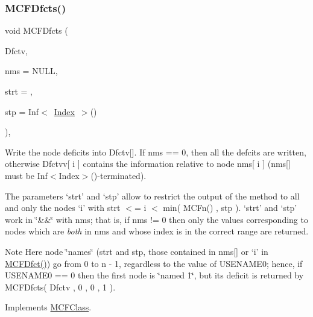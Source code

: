 \subsubsection{\texorpdfstring{M\+C\+F\+Dfcts()}{MCFDfcts()}}
{\footnotesize\ttfamily void M\+C\+F\+Dfcts (\begin{DoxyParamCaption}\item[{\mbox{\hyperlink{class_m_c_f_class_a9dae1f1a39c208ce3c2b337cd5bb3d00}{F\+Row}}}]{Dfctv,  }\item[{\mbox{\hyperlink{class_m_c_f_class_a81575b2d4e4d5636b17170432150ae69}{c\+Index\+\_\+\+Set}}}]{nms = {\ttfamily NULL},  }\item[{\mbox{\hyperlink{class_m_c_f_class_a76aaabb20535c51a2752b93f6c38fe54}{c\+Index}}}]{strt = {},  }\item[{\mbox{\hyperlink{class_m_c_f_class_ad53d6229d7ec28555a9c9c2fd9abf773}{Index}}}]{stp = {\ttfamily Inf$<$~\mbox{\hyperlink{class_m_c_f_class_ad53d6229d7ec28555a9c9c2fd9abf773}{Index}}~$>$()} }\end{DoxyParamCaption})\hspace{0.3cm}{\ttfamily [override]}, {\ttfamily [virtual]}}

Write the node deficits into Dfctv\mbox{[}\mbox{]}. If nms == 0, then all the defcits are written, otherwise Dfctvv\mbox{[} i \mbox{]} contains the information relative to node nms\mbox{[} i \mbox{]} (nms\mbox{[}\mbox{]} must be Inf$<$\+Index$>$()-\/terminated).

The parameters `strt' and `stp' allow to restrict the output of the method to all and only the nodes `i' with strt $<$= i $<$ min( M\+C\+Fn() , stp ). `strt' and `stp' work in \char`\"{}\&\&\char`\"{} with nms; that is, if nms != 0 then only the values corresponding to nodes which are {\itshape both} in nms and whose index is in the correct range are returned.

\begin{DoxyNote}{Note}
Here node \char`\"{}names\char`\"{} (strt and stp, those contained in nms\mbox{[}\mbox{]} or `i' in \mbox{\hyperlink{class_m_c_f_simplex_a160bbf78d4101054d9390b7e1a838eea}{M\+C\+F\+Dfct()}}) go from 0 to n -\/ 1, regardless to the value of U\+S\+E\+N\+A\+M\+E0; hence, if U\+S\+E\+N\+A\+M\+E0 == 0 then the first node is \char`\"{}named 1\char`\"{}, but its deficit is returned by M\+C\+F\+Dfcts( Dfctv , 0 , 0 , 1 ). 
\end{DoxyNote}


Implements \mbox{\hyperlink{class_m_c_f_class_a99e2d376efc0d9552a62f9b71512b563}{M\+C\+F\+Class}}.

